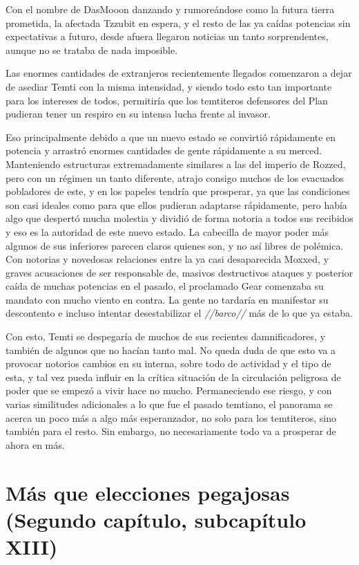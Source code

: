 \documentclass[
  spanish,
]{book}
\begin{document}
Con el nombre de DasMooon danzando y rumoreándose como la futura tierra prometida, la afectada Tzzubit en espera, y el resto de las ya caídas potencias sin expectativas a futuro, desde afuera llegaron noticias un tanto sorprendentes, aunque no se trataba de nada imposible.

Las enormes cantidades de extranjeros recientemente llegados comenzaron a dejar de asediar Temti con la misma intensidad, y siendo todo esto tan importante para los intereses de todos, permitiría que los temtiteros defensores del Plan pudieran tener un respiro en su intensa lucha frente al invasor.

Eso principalmente debido a que un nuevo estado se convirtió rápidamente en potencia y arrastró enormes cantidades de gente rápidamente a su merced. Manteniendo estructuras extremadamente similares a las del imperio de Rozzed, pero con un régimen un tanto diferente, atrajo consigo muchos de los evacuados pobladores de este, y en los papeles tendría que prosperar, ya que las condiciones son casi ideales como para que ellos pudieran adaptarse rápidamente, pero había algo que despertó mucha molestia y dividió de forma notoria a todos sus recibidos y eso es la autoridad de este nuevo estado. La cabecilla de mayor poder más algunos de sus inferiores parecen claros quienes son, y no así libres de polémica. Con notorias y novedosas relaciones entre la ya casi desaparecida Moxxed, y graves acusaciones de ser responsable de, masivos destructivos ataques y posterior caída de muchas potencias en el pasado, el proclamado Gear comenzaba su mandato con mucho viento en contra. La gente no tardaría en manifestar su descontento e incluso intentar desestabilizar el \emph{//barco//} más de lo que ya estaba.

Con esto, Temti se despegaría de muchos de sus recientes damnificadores, y también de algunos que no hacían tanto mal.
No queda duda de que esto va a provocar notorios cambios en su interna, sobre todo de actividad y el tipo de esta, y tal vez pueda influir en la crítica situación de la circulación peligrosa de poder que se empezó a vivir hace no mucho.
Permaneciendo ese riesgo, y con varias similitudes adicionales a lo que fue el pasado temtiano, el panorama se acerca un poco más a algo más esperanzador, no solo para los temtiteros, sino también para el resto. Sin embargo, no necesariamente todo va a prosperar de ahora en más.

\hypertarget{muxe1s-que-elecciones-pegajosas-segundo-capuxedtulo-subcapuxedtulo-xiii}{%
\section{Más que elecciones pegajosas (Segundo capítulo, subcapítulo XIII)}\label{muxe1s-que-elecciones-pegajosas-segundo-capuxedtulo-subcapuxedtulo-xiii}}
\end{document}
